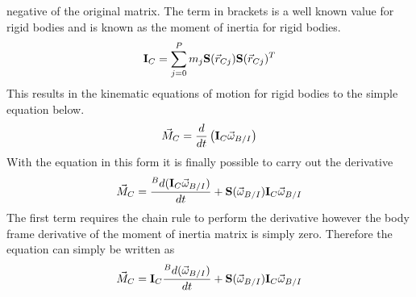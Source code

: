 \documentclass{article}
\begin{document}
negative of the original matrix. The term in brackets is a well known
value for rigid bodies and is known as the moment of inertia for rigid
bodies. 
\begin{equation}
{\bf I}_C =  \sum\limits_{j=0}^P m_j{\bf S}(\vec{r}_{Cj}){\bf
  S}(\vec{r}_{Cj})^T
\end{equation}
This results in the kinematic equations of motion for rigid bodies to
the simple equation below.
\begin{equation}
\vec{M}_C =  \frac{d}{dt}\left({\bf I}_C\vec{\omega}_{B/I} \right)
\end{equation}
With the equation in this form it is finally possible to carry out the
derivative
\begin{equation}
\vec{M}_C = \frac{{}^Bd ({\bf I}_C\vec{\omega}_{B/I})}{dt} + {\bf
  S}(\vec{\omega}_{B/I}){\bf I}_C\vec{\omega}_{B/I}
\end{equation}
The first term requires the chain rule to perform the derivative
however the body frame derivative of the moment of inertia matrix is
simply zero. Therefore the equation can simply be written as
\begin{equation}
\vec{M}_C = {\bf I}_C\frac{{}^Bd (\vec{\omega}_{B/I})}{dt} + {\bf
  S}(\vec{\omega}_{B/I}){\bf I}_C\vec{\omega}_{B/I}
\end{equation}
\end{document}
